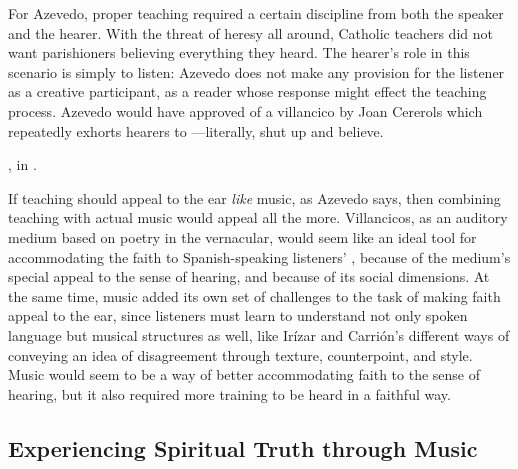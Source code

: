
For Azevedo, proper teaching required a certain discipline from both the speaker
and the hearer.
With the threat of heresy all around, Catholic teachers did not want
parishioners believing everything they heard.
The hearer's role in this scenario is simply to listen: Azevedo does not make
any provision for the listener as a creative participant, as a reader whose
response might effect the teaching process.
Azevedo would have approved of a villancico by Joan Cererols which repeatedly
exhorts hearers to ---literally, shut up and believe.%
\begin{Footnote}
    , in
    \autocite[205--212]{Cererols:MEM-VC}.
\end{Footnote}


If teaching should appeal to the ear \emph{like} music, as Azevedo says, then
combining teaching with actual music would appeal all the more.
Villancicos, as an auditory medium based on poetry in the vernacular, would seem
like an ideal tool for accommodating the faith to Spanish-speaking listeners'
, because of the medium's special appeal to the
sense of hearing, and because of its social dimensions.
At the same time, music added its own set of challenges to the task of making
faith appeal to the ear, since listeners must learn to understand not only
spoken language but musical structures as well, like Irízar and Carrión's
different ways of conveying an idea of disagreement through texture,
counterpoint, and style.
Music would seem to be a way of better accommodating faith to the sense of
hearing, but it also required more training to be heard in a faithful way.

\subsection{Experiencing Spiritual Truth through Music}

